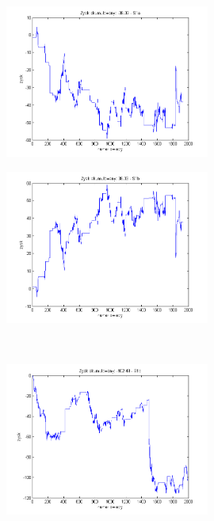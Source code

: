 \documentclass{tewiart}
\begin{document}
\FloatBarrier
\begin{figure}[h]
\centering
\begin{minipage}{\linewidth}
\centering
\includegraphics[width=0.6\textwidth]{images/fcornS1a.png}
\label{jedno}
\end{minipage}
\begin{minipage}{\linewidth}
\centering
\includegraphics[width=0.6\textwidth]{images/fcornS1b.png}
\label{dwu}
\end{minipage}
\\
\begin{minipage}{\linewidth}
\centering
\includegraphics[width=0.6\textwidth]{images/fcornS1c.png}
\label{cztero}
\end{minipage}
\begin{minipage}{\linewidth}

\end{minipage}
\end{figure}
\end{document}
